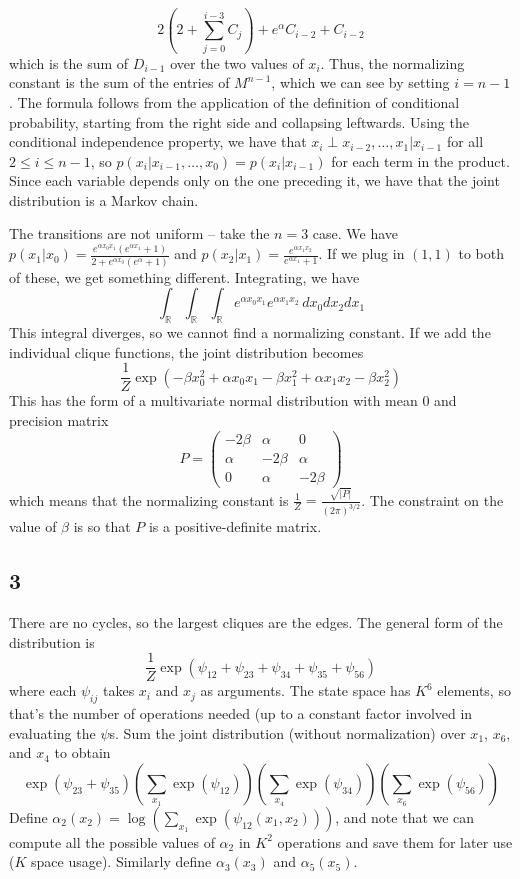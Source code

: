 \documentclass{article}
\newcommand{\openm}{\begin{pmatrix}}
\newcommand{\closem}{\end{pmatrix}}
\newcommand{\rn}{\mathbb{R}}
\begin{document}
\[2\left(2+\sum_{j=0}^{i-3}C_j\right)+e^\alpha C_{i-2}+C_{i-2}\]
which is the sum of $D_{i-1}$ over the two values of $x_i$. Thus, the normalizing constant is the sum of the entries of $M^{n-1}$, which we can see by setting $i=n-1$.
The formula follows from the application of the definition of conditional probability, starting from the right side and collapsing leftwards. Using the conditional independence property, we have that $x_{i}\perp x_{i-2},\ldots,x_1|x_{i-1}$ for all $2\leq i\leq n-1$, so $p(x_{i}|x_{i-1},\ldots,x_0)=p(x_{i}|x_{i-1})$ for each term in the product. Since each variable depends only on the one preceding it, we have that the joint distribution is a Markov chain.

The transitions are not uniform -- take the $n=3$ case. We have $p(x_1|x_0)=\frac{e^{\alpha x_0x_1}(e^{\alpha x_1}+1)}{2+e^{\alpha x_0}(e^\alpha+1)}$ and $p(x_2|x_1)=\frac{e^{\alpha x_1x_2}}{e^{\alpha x_1}+1}$. If we plug in $(1,1)$ to both of these, we get something different.
Integrating, we have 
\[\int_\rn\int_\rn\int_\rn e^{\alpha x_0x_1}e^{\alpha x_1x_2}\,dx_0dx_2dx_1\]
This integral diverges, so we cannot find a normalizing constant. If we add the individual clique functions, the joint distribution becomes
\[\frac{1}{Z}\exp\left(-\beta x_0^2+\alpha x_0x_1-\beta x_1^2+\alpha x_1x_2-\beta x_2^2\right)\]
This has the form of a multivariate normal distribution with mean $0$ and precision matrix 
\[P=\openm-2\beta&\alpha&0\\\alpha&-2\beta&\alpha\\0&\alpha&-2\beta\closem\]
which means that the normalizing constant is $\frac{1}{Z}=\frac{\sqrt{|P|}}{(2\pi)^{3/2}}$. The constraint on the value of $\beta$ is so that $P$ is a positive-definite matrix.
\subsection*{3}
\vspace{200pt}
There are no cycles, so the largest cliques are the edges. The general form of the distribution is 
\[\frac{1}{Z}\exp\left(\psi_{12}+\psi_{23}+\psi_{34}+\psi_{35}+\psi_{56}\right)\]
where each $\psi_{ij}$ takes $x_i$ and $x_j$ as arguments.
The state space has $K^6$ elements, so that's the number of operations needed (up to a constant factor involved in evaluating the $\psi$s.
Sum the joint distribution (without normalization) over $x_1$, $x_6$, and $x_4$ to obtain
\[\exp(\psi_{23}+\psi_{35})\left(\sum_{x_1}\exp(\psi_{12})\right)\left(\sum_{x_4}\exp(\psi_{34})\right)\left(\sum_{x_6}\exp(\psi_{56})\right)\]
Define $\alpha_2(x_2)=\log\left(\sum_{x_1}\exp(\psi_{12}(x_1,x_2))\right)$, and note that we can compute all the possible values of $\alpha_2$ in $K^2$ operations and save them for later use ($K$ space usage). Similarly define $\alpha_3(x_3)$ and $\alpha_5(x_5)$.
\end{document}
